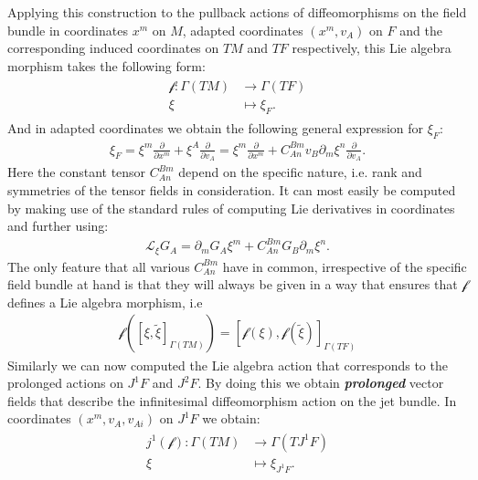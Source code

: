 \documentclass[a4paper,12pt, DIV=14, BCOR=5mm, twoside, headsepline]{scrbook}
\begin{document}
Applying this construction to the pullback actions of diffeomorphisms on the field bundle in coordinates $x^m$ on $M$, adapted coordinates $(x^m, v_A)$ on $F$ and the corresponding induced coordinates on $TM$ and $TF$ respectively, this Lie algebra morphism takes the following form:
\begin{align}\label{LieF}
\begin{aligned}
    \mathcal{f} : \Gamma(TM) &\longrightarrow \Gamma(TF)\\
    \xi &\longmapsto \xi_F .
\end{aligned}
\end{align}
And in adapted coordinates we obtain the following general expression for $\xi_F$:
\begin{align}
   \xi_F = \xi^m \frac{\partial}{\partial x^m} + \xi^A \frac{\partial}{\partial v_A} = \xi^m \frac{\partial}{\partial x^m} + C_{An}^{Bm} v_B \partial_m \xi ^n \frac{\partial}{\partial v_A}. 
\end{align}
Here the constant tensor $C_{An}^{Bm}$ depend on the specific nature, i.e. rank and symmetries of the tensor fields in consideration.
It can most easily be computed by making use of the standard rules of computing Lie derivatives in coordinates and further using:
\begin{align}
    \mathcal{L}_{\xi} G_A = \partial_m G_A \xi^m + C_{An}^{Bm} G_B \partial_m \xi ^n.
\end{align}
The only feature that all various $C_{An}^{Bm}$ have in common, irrespective of the specific field bundle at hand is that they will always be given in a way that ensures that $\mathcal{f}$ defines a Lie algebra morphism, i.e 
\begin{align}
\mathcal{f}\left ( \left [\xi, \tilde{\xi} \right ]_{\Gamma(TM)}\right ) = \left [ \mathcal{f}\left (\xi\right ), \mathcal{f}\left (\tilde{\xi}\right ) \right]_{\Gamma(TF)}
\end{align}
Similarly we can now computed the Lie algebra action that corresponds to the prolonged actions on $J^1F$ and $J^2F$. By doing this we obtain \textbf{\textit{prolonged}} vector fields that describe the infinitesimal diffeomorphism action on the jet bundle. In coordinates $(x^m,v_A,v_{Ai})$ on $J^1F$ we obtain:
\begin{align}
    \begin{aligned}
    j^1(\mathcal{f}) : \Gamma(TM) &\longrightarrow \Gamma(TJ^1F)\\
    \xi & \longmapsto \xi_{J^1F}.
    \end{aligned}
\end{align}
\end{document}
